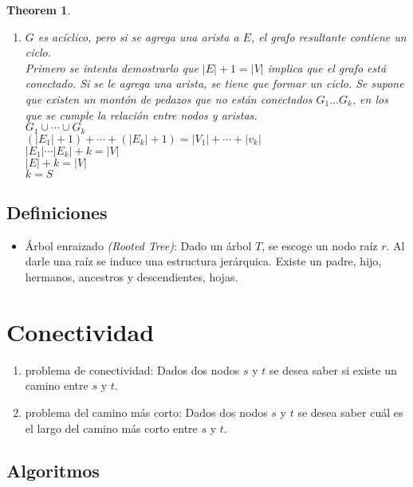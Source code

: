 \documentclass[12pt, fleqn]{article}
\newtheorem{theorem}{Theorem}[section]
\begin{document}
\begin{theorem}
\begin{enumerate}
                    \item $G$ es acíclico, pero si se agrega una arista a $E$, el grafo resultante contiene un ciclo. \\ \emph{Primero se intenta demostrarlo
                                que $|E| +1 = |V|$ implica que el grafo está conectado. Si se le agrega una arista, se tiene que formar un ciclo. Se supone que existen
                                un montón de pedazos que no están conectados $G_1 \dots G_k$, en los que se cumple la relación entre nodos y aristas.\\
                                $G_1 \cup \cdots \cup G_k$ \\ 
                                $(|E_1| +1) + \cdots + (|E_k| +1) = |V_1| +\cdots+ |v_k| $\\
                                $|E_1| \cdots |E_k| + k = |V|$ \\
                                $|E| + k = |V|$ \\
                                $k = S$  }
                \end{enumerate}
            \end{theorem}
        \subsection{Definiciones}
            \begin{itemize}
                \item Árbol enraizado \emph{(Rooted Tree)}: Dado un árbol $T$, se escoge un nodo raíz $r$. Al darle una raíz se induce una estructura jerárquica.
                    Existe un padre, hijo, hermanos, ancestros y descendientes, hojas.
            \end{itemize}
    \section{Conectividad}
        \begin{enumerate}
            \item problema de conectividad: Dados dos nodos $s$ y $t$ se desea saber si existe un camino entre $s$ y $t$.
            \item problema del camino más corto: Dados dos nodos $s$ y $t$ se desea saber cuál es el largo del camino más corto entre $s$ y $t$.
        \end{enumerate}

        \subsection{Algoritmos}
\end{document}
